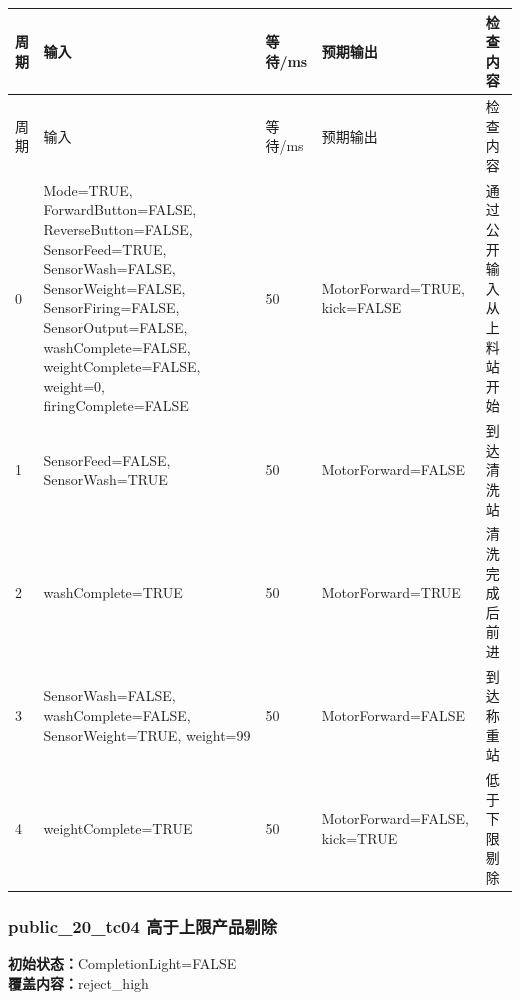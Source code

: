 \begin{longtable}{L{1.0cm}L{4.7cm}L{1.4cm}L{4.0cm}L{2.1cm}}

\toprule

周期 & 输入 & 等待/ms & 预期输出 & 检查内容\\

\midrule

\endfirsthead

\toprule

周期 & 输入 & 等待/ms & 预期输出 & 检查内容\\

\midrule

\endhead

0 & Mode=TRUE, ForwardButton=FALSE, ReverseButton=FALSE, SensorFeed=TRUE, SensorWash=FALSE, SensorWeight=FALSE, SensorFiring=FALSE, SensorOutput=FALSE, washComplete=FALSE, weightComplete=FALSE, weight=0, firingComplete=FALSE & 50 & MotorForward=TRUE, kick=FALSE & 通过公开输入从上料站开始\\

1 & SensorFeed=FALSE, SensorWash=TRUE & 50 & MotorForward=FALSE & 到达清洗站\\

2 & washComplete=TRUE & 50 & MotorForward=TRUE & 清洗完成后前进\\

3 & SensorWash=FALSE, washComplete=FALSE, SensorWeight=TRUE, weight=99 & 50 & MotorForward=FALSE & 到达称重站\\

4 & weightComplete=TRUE & 50 & MotorForward=FALSE, kick=TRUE & 低于下限剔除\\

\bottomrule

\end{longtable}

\subsubsection{{\ttfamily public\_20\_tc04} 高于上限产品剔除}

\noindent\textbf{初始状态：}CompletionLight=FALSE\\

\textbf{覆盖内容：}reject\_high


